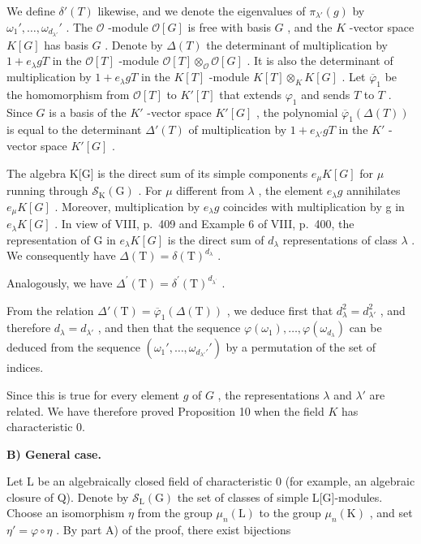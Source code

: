 We define \(\delta'(T)\) likewise, and we denote the eigenvalues of \(\pi_{\lambda'}(g)\) by \(\omega_1', \ldots, \omega_{d_{\lambda'}}'\) . The \(\mathcal{O}\) -module \(\mathcal{O}[G]\) is free with basis \(G\) , and the \(K\) -vector space \(K[G]\) has basis \(G\) . Denote by \(\Delta(T)\) the determinant of multiplication by \(1 + e_{\lambda}gT\) in the \(\mathcal{O}[T]\) -module \(\mathcal{O}[T] \otimes_{\mathcal{O}} \mathcal{O}[G]\) . It is also the determinant of multiplication by \(1 + e_{\lambda}gT\) in the \(K[T]\) -module \(K[T] \otimes_K K[G]\) . Let \(\overline{\varphi}_1\) be the homomorphism from \(\mathcal{O}[T]\) to \(K'[T]\) that extends \(\varphi_1\) and sends \(T\) to \(T\) . Since \(G\) is a basis of the \(K'\) -vector space \(K'[G]\) , the polynomial \(\overline{\varphi}_1(\Delta(T))\) is equal to the determinant \(\Delta'(T)\) of multiplication by \(1 + e_{\lambda'}gT\) in the \(K'\) -vector space \(K'[G]\) .

The algebra K{[}G{]} is the direct sum of its simple components \(e_{\mu}K[G]\) for \(\mu\) running through \(\mathcal{S}_{\mathrm{K}}(\mathrm{G})\) . For \(\mu\) different from \(\lambda\) , the element \(e_{\lambda}g\) annihilates \(e_{\mu}K[G]\) . Moreover, multiplication by \(e_{\lambda}g\) coincides with multiplication by g in \(e_{\lambda}K[G]\) . In view of VIII, p.~409 and Example 6 of VIII, p.~400, the representation of G in \(e_{\lambda}K[G]\) is the direct sum of \(d_{\lambda}\) representations of class \(\lambda\) . We consequently have \(\Delta(\mathrm{T}) = \delta(\mathrm{T})^{d_{\lambda}}\) .

Analogously, we have \(\Delta^{\prime}(\mathrm{T}) = \delta^{\prime}(\mathrm{T})^{d_{\lambda^{\prime}}}\) .

From the relation \(\Delta'(\mathrm{T}) = \overline{\varphi}_1(\Delta(\mathrm{T}))\) , we deduce first that \(d_{\lambda}^2 = d_{\lambda'}^2\) , and therefore \(d_{\lambda} = d_{\lambda'}\) , and then that the sequence \(\varphi(\omega_1), \ldots, \varphi(\omega_{d_\lambda})\) can be deduced from the sequence \((\omega_1', \ldots, \omega_{d_{\lambda'}'}')\) by a permutation of the set of indices.

Since this is true for every element \(g\) of \(G\) , the representations \(\lambda\) and \(\lambda'\) are related. We have therefore proved Proposition 10 when the field \(K\) has characteristic 0.

\textbf{B) General case.}

Let L be an algebraically closed field of characteristic 0 (for example, an algebraic closure of Q). Denote by \(\mathcal{S}_{\mathrm{L}}(\mathrm{G})\) the set of classes of simple L{[}G{]}-modules. Choose an isomorphism \(\eta\) from the group \(\mu_{n}(\mathrm{L})\) to the group \(\mu_{n}(\mathrm{K})\) , and set \(\eta' = \varphi \circ \eta\) . By part A) of the proof, there exist bijections

